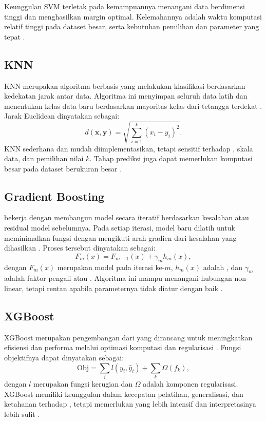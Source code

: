 Keunggulan SVM terletak pada kemampuannya menangani data berdimensi tinggi dan menghasilkan margin optimal. Kelemahannya adalah waktu komputasi relatif tinggi pada dataset besar, serta kebutuhan pemilihan  dan parameter yang tepat \cite{ref10}.

\subsection{KNN}
KNN merupakan algoritma berbasis  yang melakukan klasifikasi berdasarkan kedekatan jarak antar data. Algoritma ini menyimpan seluruh data latih dan menentukan kelas data baru berdasarkan mayoritas kelas dari tetangga terdekat \cite{ref14}. Jarak Euclidean dinyatakan sebagai:
\begin{equation}
 d(\mathbf{x},\mathbf{y})=\sqrt{\sum_{i=1}^{k}(x_i-y_i)^2}.
 \label{eq:euclidean}
\end{equation}
KNN sederhana dan mudah diimplementasikan, tetapi sensitif terhadap , skala data, dan pemilihan nilai $k$. Tahap prediksi juga dapat memerlukan komputasi besar pada dataset berukuran besar \cite{ref14,ref34}.

\subsection{Gradient Boosting}
 bekerja dengan membangun model secara iteratif berdasarkan kesalahan atau residual model sebelumnya. Pada setiap iterasi, model baru dilatih untuk meminimalkan fungsi  dengan mengikuti arah gradien dari kesalahan yang dihasilkan \cite{ref35}. Proses tersebut dinyatakan sebagai:
\begin{equation}
 F_m(x)=F_{m-1}(x)+\gamma_m h_m(x),
 \label{eq:gradient-boosting}
\end{equation}
dengan $F_m(x)$ merupakan model pada iterasi ke-$m$, $h_m(x)$ adalah , dan $\gamma_m$ adalah faktor pengali atau . Algoritma ini mampu menangani hubungan non-linear, tetapi rentan  apabila parameternya tidak diatur dengan baik \cite{ref35}.

\subsection{XGBoost}
XGBoost merupakan pengembangan dari  yang dirancang untuk meningkatkan efisiensi dan performa melalui optimasi komputasi dan regularisasi \cite{ref36}. Fungsi objektifnya dapat dinyatakan sebagai:
\begin{equation}
 \mathrm{Obj}=\sum_i l(y_i,\hat{y}_i)+\sum_k\Omega(f_k),
 \label{eq:xgboost}
\end{equation}
dengan $l$ merupakan fungsi kerugian dan $\Omega$ adalah komponen regularisasi. XGBoost memiliki keunggulan dalam kecepatan pelatihan, generalisasi, dan ketahanan terhadap , tetapi memerlukan  yang lebih intensif dan interpretasinya lebih sulit \cite{ref36}.

